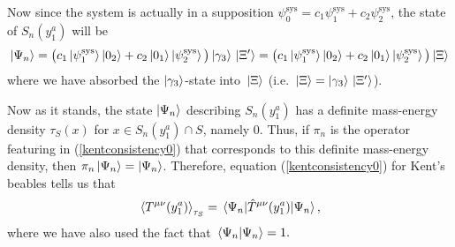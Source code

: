  Now since the system is actually in a supposition $\psi_0^\text{sys} = c_1\psi_1^\text{sys}+c_2\psi_2^\text{sys}$, the state of $S_n(y^a_1)$ will be 
 \begin{equation*}
 \ket{\Psi_n}=\big(c_1\ket{\psi_1^\text{sys}}\ket{0_2}+c_2\ket{0_1}\ket{\psi_2^\text{sys}}\big)\ket{\gamma_3}\ket*{\Xi'}=\big(c_1\ket{\psi_1^\text{sys}}\ket{0_2}+c_2\ket{0_1}\ket{\psi_2^\text{sys}}\big)\ket*{\Xi}
 \end{equation*}
where we have absorbed the $\ket{\gamma_3}$-state into $\ket*{\Xi}$ (i.e. $\ket*{\Xi}= \ket{\gamma_3}\ket*{\Xi'}$).

Now as it stands, the state $\ket{\Psi_n}$ describing $S_n(y^a_1)$ has a definite mass-energy density $\tau_S(x)$ for $x\in S_n(y^a_1)\cap S$, namely $0$. Thus, if $\pi_n$ is the operator featuring in (\ref{kentconsistency0}) that corresponds to this definite mass-energy density, then $\pi_n\ket{\Psi_n}=\ket{\Psi_n}$. Therefore, equation (\ref{kentconsistency0}) for Kent's beables tells us that
\begin{equation}\label{kentbeablenoinfo}
\ev*{T^{\mu\nu}(y^a_1)}_{\tau_S}=\ev*{\hat{T}^{\mu\nu}(y^a_1)}{\Psi_n},
\end{equation}
where we have also used the fact that $\ip*{\Psi_n}{\Psi_n}=1.$

